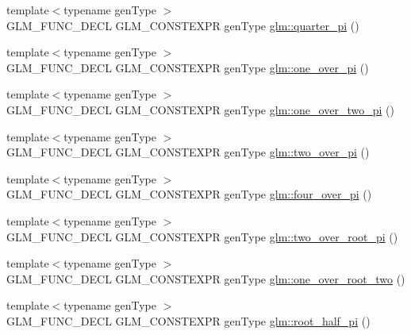 \begin{DoxyCompactItemize}
\item 
{\footnotesize template$<$typename gen\+Type $>$ }\\G\+L\+M\+\_\+\+F\+U\+N\+C\+\_\+\+D\+E\+CL G\+L\+M\+\_\+\+C\+O\+N\+S\+T\+E\+X\+PR gen\+Type \hyperlink{group__gtc__constants_ga3c9df42bd73c519a995c43f0f99e77e0}{glm\+::quarter\+\_\+pi} ()
\item 
{\footnotesize template$<$typename gen\+Type $>$ }\\G\+L\+M\+\_\+\+F\+U\+N\+C\+\_\+\+D\+E\+CL G\+L\+M\+\_\+\+C\+O\+N\+S\+T\+E\+X\+PR gen\+Type \hyperlink{group__gtc__constants_ga555150da2b06d23c8738981d5013e0eb}{glm\+::one\+\_\+over\+\_\+pi} ()
\item 
{\footnotesize template$<$typename gen\+Type $>$ }\\G\+L\+M\+\_\+\+F\+U\+N\+C\+\_\+\+D\+E\+CL G\+L\+M\+\_\+\+C\+O\+N\+S\+T\+E\+X\+PR gen\+Type \hyperlink{group__gtc__constants_ga7c922b427986cbb2e4c6ac69874eefbc}{glm\+::one\+\_\+over\+\_\+two\+\_\+pi} ()
\item 
{\footnotesize template$<$typename gen\+Type $>$ }\\G\+L\+M\+\_\+\+F\+U\+N\+C\+\_\+\+D\+E\+CL G\+L\+M\+\_\+\+C\+O\+N\+S\+T\+E\+X\+PR gen\+Type \hyperlink{group__gtc__constants_ga74eadc8a211253079683219a3ea0462a}{glm\+::two\+\_\+over\+\_\+pi} ()
\item 
{\footnotesize template$<$typename gen\+Type $>$ }\\G\+L\+M\+\_\+\+F\+U\+N\+C\+\_\+\+D\+E\+CL G\+L\+M\+\_\+\+C\+O\+N\+S\+T\+E\+X\+PR gen\+Type \hyperlink{group__gtc__constants_ga753950e5140e4ea6a88e4a18ba61dc09}{glm\+::four\+\_\+over\+\_\+pi} ()
\item 
{\footnotesize template$<$typename gen\+Type $>$ }\\G\+L\+M\+\_\+\+F\+U\+N\+C\+\_\+\+D\+E\+CL G\+L\+M\+\_\+\+C\+O\+N\+S\+T\+E\+X\+PR gen\+Type \hyperlink{group__gtc__constants_ga5827301817640843cf02026a8d493894}{glm\+::two\+\_\+over\+\_\+root\+\_\+pi} ()
\item 
{\footnotesize template$<$typename gen\+Type $>$ }\\G\+L\+M\+\_\+\+F\+U\+N\+C\+\_\+\+D\+E\+CL G\+L\+M\+\_\+\+C\+O\+N\+S\+T\+E\+X\+PR gen\+Type \hyperlink{group__gtc__constants_ga788fa23a0939bac4d1d0205fb4f35818}{glm\+::one\+\_\+over\+\_\+root\+\_\+two} ()
\item 
{\footnotesize template$<$typename gen\+Type $>$ }\\G\+L\+M\+\_\+\+F\+U\+N\+C\+\_\+\+D\+E\+CL G\+L\+M\+\_\+\+C\+O\+N\+S\+T\+E\+X\+PR gen\+Type \hyperlink{group__gtc__constants_ga4e276cb823cc5e612d4f89ed99c75039}{glm\+::root\+\_\+half\+\_\+pi} ()

\end{DoxyCompactItemize}
